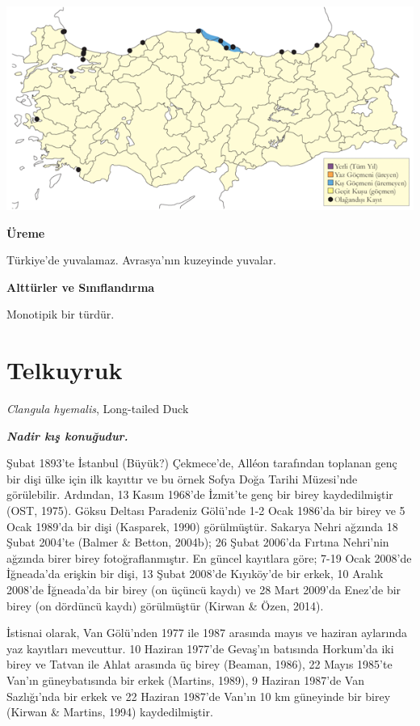 \documentclass[
  a4paper,
  DIV=11,
  numbers=noendperiod]{scrreprt}
\begin{document}
\includegraphics{images/harita_Page_029.png}

\textbf{Üreme}

Türkiye'de yuvalamaz. Avrasya'nın kuzeyinde yuvalar.

\textbf{Alttürler ve Sınıflandırma}

Monotipik bir türdür.

\section{Telkuyruk}\label{telkuyruk}

\emph{Clangula hyemalis}, Long-tailed Duck

\textbf{\emph{Nadir kış konuğudur.}}

Şubat 1893'te İstanbul (Büyük?) Çekmece'de, Alléon tarafından toplanan
genç bir dişi ülke için ilk kayıttır ve bu örnek Sofya Doğa Tarihi
Müzesi'nde görülebilir. Ardından, 13 Kasım 1968'de İzmit'te genç bir
birey kaydedilmiştir (OST, 1975). Göksu Deltası Paradeniz Gölü'nde 1-2
Ocak 1986'da bir birey ve 5 Ocak 1989'da bir dişi (Kasparek, 1990)
görülmüştür. Sakarya Nehri ağzında 18 Şubat 2004'te (Balmer \& Betton,
2004b); 26 Şubat 2006'da Fırtına Nehri'nin ağzında birer birey
fotoğraflanmıştır. En güncel kayıtlara göre; 7-19 Ocak 2008'de
İğneada'da erişkin bir dişi, 13 Şubat 2008'de Kıyıköy'de bir erkek, 10
Aralık 2008'de İğneada'da bir birey (on üçüncü kaydı) ve 28 Mart 2009'da
Enez'de bir birey (on dördüncü kaydı) görülmüştür (Kirwan \& Özen,
2014).

İstisnai olarak, Van Gölü'nden 1977 ile 1987 arasında mayıs ve haziran
aylarında yaz kayıtları mevcuttur. 10 Haziran 1977'de Gevaş'ın batısında
Horkum'da iki birey ve Tatvan ile Ahlat arasında üç birey (Beaman,
1986), 22 Mayıs 1985'te Van'ın güneybatısında bir erkek (Martins, 1989),
9 Haziran 1987'de Van Sazlığı'nda bir erkek ve 22 Haziran 1987'de Van'ın
10 km güneyinde bir birey (Kirwan \& Martins, 1994) kaydedilmiştir.
\end{document}
